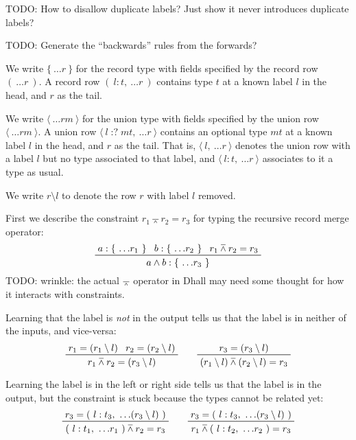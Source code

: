 \documentclass[11pt, twoside, reqno]{book}
\providecommand{\lcurvyangle}{\langle}
\providecommand{\rcurvyangle}{\rangle}
\providecommand{\wedgeonwedge}{\barwedge}
\begin{document}
TODO: How to disallow duplicate labels?
Just show it never introduces duplicate labels?

TODO: Generate the ``backwards'' rules from the forwards?

We write \(\{\ \dots\!r\ \}\) for the record type with fields specified by the record row \((\ \dots\!r\ )\).
A record row \((\ l : t,\ \dots\!r\ )\) contains type \(t\) at a known label \(l\) in the head, and \(r\) as the tail.

We write \(\langle\ \dots\!\mathit{rm}\ \rangle\) for the union type with fields specified by the union row \(\lcurvyangle\ \dots\!\mathit{rm}\ \rcurvyangle\).
A union row $\lcurvyangle\ l \mathop{{:}{?}} \mathit{mt},\ \dots\!r\ \rcurvyangle$ contains an optional type \(\mathit{mt}\) at a known label \(l\) in the head, and \(r\) as the tail.
That is, \(\lcurvyangle\ l,\ \dots\!r\ \rcurvyangle\) denotes the union row with a label \(l\) but no type associated to that label, and \(\lcurvyangle\ l : t,\ \dots\!r\ \rcurvyangle\) associates to it a type as usual.

We write \(r \setminus l\) to denote the row \(r\) with label \(l\) removed.

First we describe the constraint \(r_1 \wedgeonwedge r_2 = r_3\) for typing the recursive record merge operator:
\begin{displaymath}
\prftree{a : \{\ \dots\!r_1\ \}}{b : \{\ \dots\!r_2\ \}}{r_1 \wedgeonwedge r_2 = r_3}{a \land b : \{\ \dots\!r_3\ \}}
\end{displaymath}
TODO: wrinkle: the actual \(\wedgeonwedge\) operator in Dhall may need some thought for how it interacts with constraints.

Learning that the label is \emph{not} in the output tells us that the label is in neither of the inputs, and vice-versa:
\begin{displaymath}
\prftree{r_1 = (r_1 \setminus l)}{r_2 = (r_2 \setminus l)}{r_1 \wedgeonwedge r_2 = (r_3 \setminus l)}
\qquad
\prftree{r_3 = (r_3 \setminus l)}{(r_1 \setminus l) \wedgeonwedge (r_2 \setminus l) = r_3}
\end{displaymath}

Learning the label is in the left or right side tells us that the label is in the output, but the constraint is stuck because the types cannot be related yet:
\begin{displaymath}
\prftree
  {r_3 = (\ l : t_3,\ \dots\!(r_3 \setminus l)\ )}
  {(\ l : t_1,\ \dots\!r_1\ ) \wedgeonwedge r_2 = r_3}
\qquad
\prftree
  {r_3 = (\ l : t_3,\ \dots\!(r_3 \setminus l)\ )}
  {r_1 \wedgeonwedge (\ l : t_2,\ \dots\!r_2\ ) = r_3}
\end{displaymath}
\end{document}
